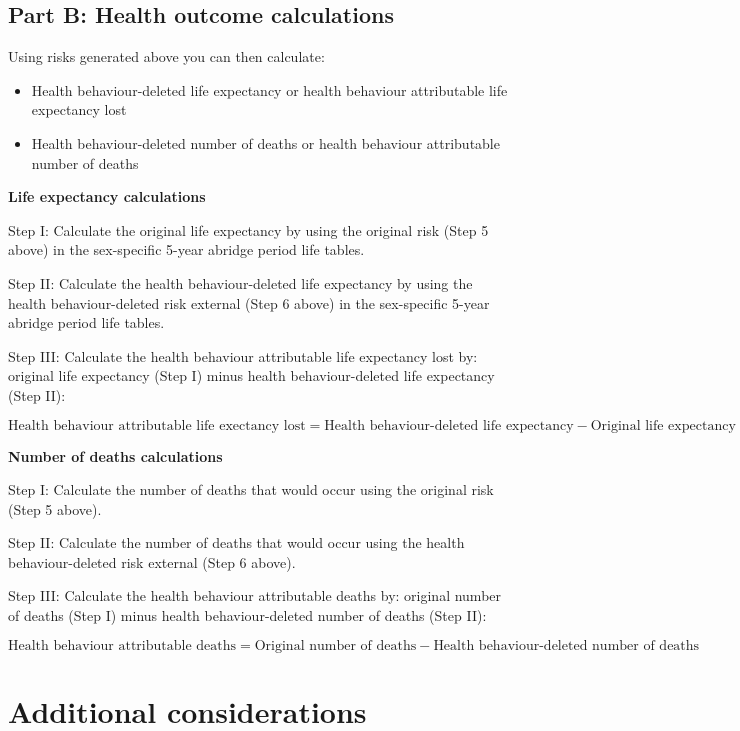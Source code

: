 \documentclass[]{book}
\providecommand{\tightlist}{%
  \setlength{\itemsep}{0pt}\setlength{\parskip}{0pt}}
\begin{document}
\hypertarget{part-b-health-outcome-calculations}{%
\subsection{Part B: Health outcome calculations}\label{part-b-health-outcome-calculations}}

Using risks generated above you can then calculate:

\begin{itemize}
\tightlist
\item
  Health behaviour-deleted life expectancy or health behaviour attributable life expectancy lost
\item
  Health behaviour-deleted number of deaths or health behaviour attributable number of deaths
\end{itemize}

\textbf{Life expectancy calculations}

Step I: Calculate the original life expectancy by using the original risk (Step 5 above) in the sex-specific 5-year abridge period life tables.

Step II: Calculate the health behaviour-deleted life expectancy by using the health behaviour-deleted risk external (Step 6 above) in the sex-specific 5-year abridge period life tables.

Step III: Calculate the health behaviour attributable life expectancy lost by: original life expectancy (Step I) minus health behaviour-deleted life expectancy (Step II):

\[ \text{Health behaviour attributable life exectancy lost} = \text{Health behaviour-deleted life expectancy} - \text{Original life expectancy}\]

\textbf{Number of deaths calculations}

Step I: Calculate the number of deaths that would occur using the original risk (Step 5 above).

Step II: Calculate the number of deaths that would occur using the health behaviour-deleted risk external (Step 6 above).

Step III: Calculate the health behaviour attributable deaths by: original number of deaths (Step I) minus health behaviour-deleted number of deaths (Step II):

\[\text{Health behaviour attributable deaths} = \text{Original number of deaths} - \text{Health behaviour-deleted number of deaths}\]

\hypertarget{additional-considerations}{%
\section{Additional considerations}\label{additional-considerations}}
\end{document}
